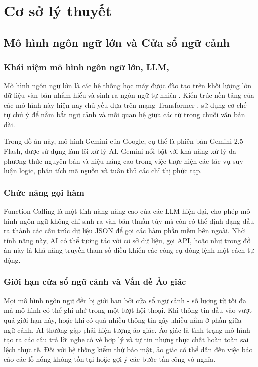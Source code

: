 \chapter{Cơ sở lý thuyết}

\section{Mô hình ngôn ngữ lớn và Cửa sổ ngữ cảnh}
\subsection{Khái niệm mô hình ngôn ngữ lớn, LLM,}
Mô hình ngôn ngữ lớn là các hệ thống học máy được đào tạo trên khối lượng lớn dữ liệu văn bản nhằm hiểu và sinh ra ngôn ngữ tự nhiên \cite{gemini2023}. Kiến trúc nền tảng của các mô hình này hiện nay chủ yếu dựa trên mạng Transformer \cite{vaswani2017attention}, sử dụng cơ chế tự chú ý để nắm bắt ngữ cảnh và mối quan hệ giữa các từ trong chuỗi văn bản dài. 

Trong đồ án này, mô hình Gemini của Google, cụ thể là phiên bản Gemini 2.5 Flash, được sử dụng làm lõi xử lý AI. Gemini nổi bật với khả năng xử lý đa phương thức nguyên bản và hiệu năng cao trong việc thực hiện các tác vụ suy luận logic, phân tích mã nguồn và tuân thủ các chỉ thị phức tạp.

\subsection{Chức năng gọi hàm}
Function Calling là một tính năng năng cao của các LLM hiện đại, cho phép mô hình ngôn ngữ không chỉ sinh ra văn bản thuần túy mà còn có thể định dạng đầu ra thành các cấu trúc dữ liệu JSON để gọi các hàm phần mềm bên ngoài. Nhờ tính năng này, AI có thể tương tác với cơ sở dữ liệu, gọi API, hoặc như trong đồ án này là khả năng truyền tham số điều khiển các công cụ dòng lệnh một cách tự động.

\subsection{Giới hạn cửa sổ ngữ cảnh và Vấn đề Ảo giác}
Mọi mô hình ngôn ngữ đều bị giới hạn bởi cửa sổ ngữ cảnh - số lượng từ tối đa mà mô hình có thể ghi nhớ trong một lượt hội thoại. Khi thông tin đầu vào vượt quá giới hạn này, hoặc khi có quá nhiều thông tin gây nhiễu nằm ở phần giữa ngữ cảnh, AI thường gặp phải hiện tượng ảo giác. Ảo giác là tình trạng mô hình tạo ra các câu trả lời nghe có vẻ hợp lý và tự tin nhưng thực chất hoàn toàn sai lệch thực tế. Đối với hệ thống kiểm thử bảo mật, ảo giác có thể dẫn đến việc báo cáo các lỗ hổng không tồn tại hoặc gợi ý các bước tấn công vô nghĩa.

